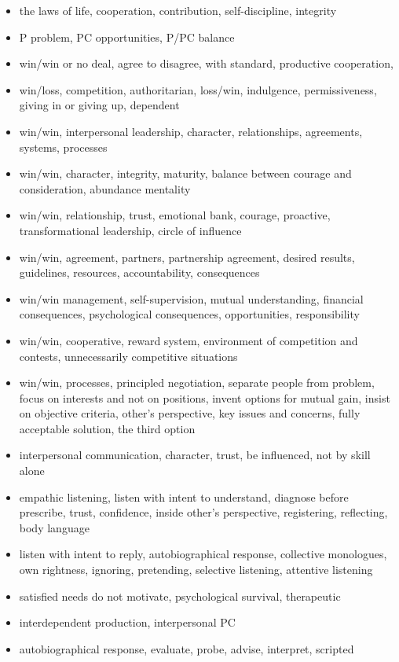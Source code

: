 \documentclass[11pt]{article}
\begin{document}
\begin{itemize}
\item the laws of life, cooperation, contribution, self-discipline, integrity
\item P problem, PC opportunities, P/PC balance
\item win/win or no deal, agree to disagree, with standard, productive cooperation, 
\item win/loss, competition, authoritarian, loss/win, indulgence, permissiveness, giving in or giving up, dependent 
\item win/win, interpersonal leadership, character, relationships, agreements, systems, processes 
\item win/win, character, integrity, maturity, balance between courage and consideration, abundance mentality
\item win/win, relationship, trust, emotional bank, courage, proactive, transformational leadership, circle of influence
\item win/win, agreement, partners, partnership agreement, desired results, guidelines, resources, accountability, consequences
\item win/win management,  self-supervision, mutual understanding, financial consequences, psychological consequences, opportunities, responsibility
\item win/win, cooperative, reward system, environment of competition and contests, unnecessarily competitive situations
\item win/win, processes, principled negotiation, separate people from problem, focus on interests and not on positions, invent options for mutual gain, insist on objective criteria, other's perspective, key issues and concerns, fully acceptable solution,  the third option
\item interpersonal communication,  character, trust, be influenced,  not by skill alone
\item empathic listening, listen with intent to understand, diagnose before prescribe, trust, confidence, inside other's perspective, registering, reflecting, body language
\item listen with intent to reply, autobiographical response, collective monologues, own rightness, ignoring, pretending, selective listening, attentive listening
\item satisfied needs do not motivate, psychological survival, therapeutic
\item interdependent production, interpersonal PC
\item autobiographical response, evaluate, probe, advise, interpret, scripted

\end{itemize}
\end{document}
